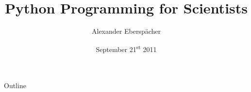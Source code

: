 \documentclass[compress]{beamer}
\title[] %
{Python Programming for Scientists}
\author[] %
{Alexander Eberspächer}
\date[]{September 21\textsuperscript{st} 2011} %
\begin{document}
\begin{frame} %
  \titlepage
  \thispagestyle{empty}
\end{frame}

\begin{frame}{Outline} %
  \tableofcontents
\end{frame}






\end{document}
